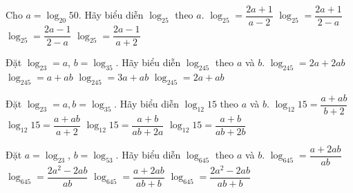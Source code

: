 \begin{ex}%
	Cho $a=\log_{20}50$. Hãy biểu diễn $\log_25$ theo $a$.
	\choice
	{$\log_25=\dfrac{2a+1}{a-2}$}
	{$\log_25=\dfrac{2a+1}{2-a}$}
	{\True $\log_25=\dfrac{2a-1}{2-a}$}
	{$\log_25=\dfrac{2a-1}{a+2}$}
\end{ex}

\begin{ex}%
	Đặt $\log_23=a$, $b=\log_35$. Hãy biểu diễn $\log_245$ theo $a$ và $b$.
	\choice
	{$\log_245=2a+2ab$}
	{$\log_245=a+ab$}
	{$\log_245=3a+ab$}
	{\True $\log_245=2a+ab$}
\end{ex}

\begin{ex}%
	Đặt $\log_23=a,b=\log_35$. Hãy biểu diễn $\log_{12}15$ theo $a$ và $b$.
	\choice
	{$\log_{12}15=\dfrac{a+ab}{b+2}$}
	{\True $\log_{12}15=\dfrac{a+ab}{a+2}$}
	{$\log_{12}15=\dfrac{a+b}{ab+2a}$}
	{$\log_{12}15=\dfrac{a+b}{ab+2b}$}
\end{ex}

\begin{ex}%
	Đặt $a=\log_23$, $b=\log_53$. Hãy biểu diễn $\log_645$ theo $a$ và $b$.
	\choice
	{$\log_645=\dfrac{a+2ab}{ab}$}
	{$\log_645=\dfrac{2a^2-2ab}{ab}$}
	{\True $\log_645=\dfrac{a+2ab}{ab+b}$}
	{$\log_645=\dfrac{2a^2-2ab}{ab+b}$}
\end{ex}

